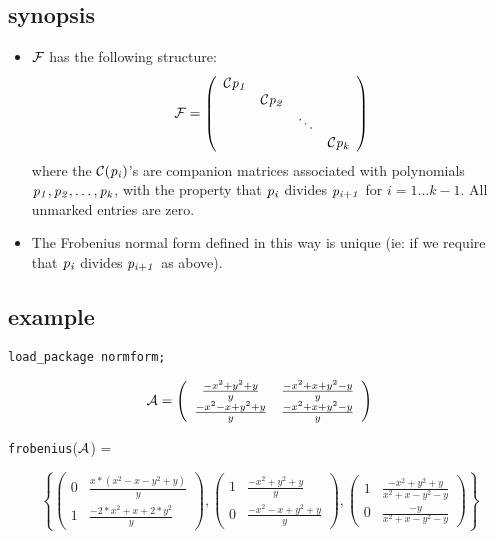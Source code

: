 \subsection{synopsis}

\begin{itemize}
\item ${\cal F}$ has the following structure:
      \begin{displaymath}
      {\cal F} = \left( \begin{array}{cccc} {\cal C}{\it p_{1}} &  &  & 
      \\  & {\cal C}{\it p_{2}} &  &  \\  &  & \ddots &  \\  &  &  & 
      {\cal C}{\it p_{k}} \end{array} \right) 
      \end{displaymath}
      where the ${\cal C}({\it p_{i}})$'s are companion matrices 
      associated with polynomials ${\it p_{1}, p_{2}},\ldots, 
      {\it p_{k}}$, with the property that ${\it p_{i}}$ divides 
      ${\it p_{i+1}}$ for $i =1\ldots k-1$. All unmarked entries are 
      zero.

\item The Frobenius normal form defined in this way is unique (ie: if 
      we require that ${\it p_{i}}$ divides ${\it p_{i+1}}$ as above).
\end{itemize}
 
\subsection{example}

{\tt load\_package normform;}

\begin{displaymath}
{\cal A} = \left( \begin{array}{cc} \frac{-x^2+y^2+y}{y} & 
\frac{-x^2+x+y^2-y}{y} \\ \frac{-x^2-x+y^2+y}{y} & \frac{-x^2+x+y^2-y}
{y} \end{array} \right)
\end{displaymath}

{\tt frobenius}(${\cal A}$) = 
\begin{center}
\begin{displaymath}
\left\{ \left( \begin{array}{cc} 0 & \frac{x*(x^2-x-y^2+y)}{y} \\ 1 & 
\frac{-2*x^2+x+2*y^2}{y} \end{array} \right), \left( \begin{array}{cc}
1 & \frac{-x^2+y^2+y}{y} \\ 0 & \frac{-x^2-x+y^2+y}{y} \end{array} 
\right), \left( \begin{array}{cc} 1 & \frac{-x^2+y^2+y}{x^2+x-y^2-y} \\
0 & \frac{-y}{x^2+x-y^2-y} \end{array} \right) \right\}
\end{displaymath}
\end{center}


